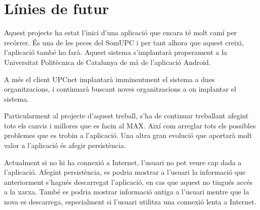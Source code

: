 
\section{Línies de futur} 

Aquest projecte ha estat l'inici d'una aplicació que encara té molt camí per recórrer. És una de les peces del SomUPC i per tant alhora que aquest creixi, l'aplicació també ho farà. Aquest sistema s'implantarà properament a la Universitat Politècnica de Catalunya de mà de l'aplicació Android.

A més el client UPCnet implantarà imminentment el sistema a dues organitzacions, i continuarà buscant noves organitzacions a on implantar el sistema.

Particularment al projecte d'aquest treball, s'ha de continuar treballant afegint tots els canvis i millores que es facin al MAX. Així com arreglar tots els possibles problemes que es trobin a l'aplicació. Una altra gran evolució que aportarà molt valor a l'aplicació és afegir persistència.

Actualment si no hi ha connexió a Internet, l'usuari no pot veure cap dada a l'aplicació. Afegint persistència, es podria mostrar a l'usuari la informació que anteriorment s'hagués descarregat l'aplicació, en cas que aquest no tingués accés a la xarxa. També es podria mostrar informació antiga a l'usuari mentre que la nova es descarrega, especialment si l'usuari utilitza una connexió lenta a Internet. 
